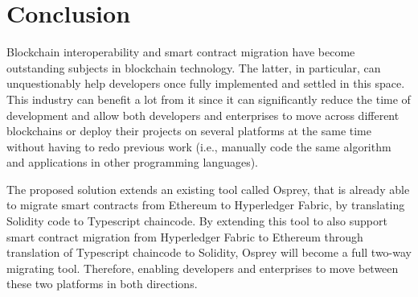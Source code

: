 \documentclass[runningheads]{llncs}
\begin{document}
\section{Conclusion} \label{conclusion}
Blockchain interoperability and smart contract migration have become outstanding subjects in blockchain technology. The latter, in particular, can unquestionably help developers once fully implemented and settled in this space. This industry can benefit a lot from it since it can significantly reduce the time of development and allow both developers and enterprises to move across different blockchains or deploy their projects on several platforms at the same time without having to redo previous work (i.e., manually code the same algorithm and applications in other programming languages).

The proposed solution extends an existing tool called Osprey, that is already able to migrate smart contracts from Ethereum to Hyperledger Fabric, by translating Solidity code to Typescript chaincode. By extending this tool to also support smart contract migration from Hyperledger Fabric to Ethereum through translation of Typescript chaincode to Solidity, Osprey will become a full two-way migrating tool. Therefore, enabling developers and enterprises to move between these two platforms in both directions.



\newpage






\end{document}
